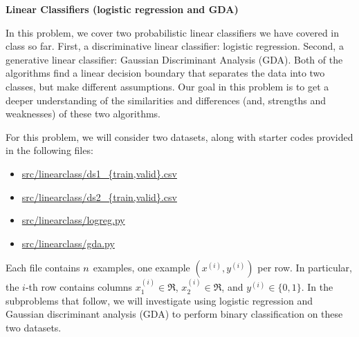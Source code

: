 \item {} {\bf Linear Classifiers (logistic regression and GDA)}

In this problem, we cover two probabilistic linear classifiers we have
covered in class so far. First, a discriminative linear classifier: logistic
regression. Second, a generative linear classifier: Gaussian Discriminant Analysis (GDA). Both of the algorithms find a linear decision boundary that
separates the data into two classes, but make different assumptions. Our goal
in this problem is to get a deeper understanding of the similarities and
differences (and, strengths and weaknesses) of these two algorithms.

For this problem, we will consider two datasets, along with starter codes provided in the following
files:
\begin{center}
\begin{itemize} %
	\item \url{src/linearclass/ds1_{train,valid}.csv}
	\item \url{src/linearclass/ds2_{train,valid}.csv}
        \item \url{src/linearclass/logreg.py}
        \item \url{src/linearclass/gda.py}
\end{itemize}
\end{center}
Each file contains ${n}$ examples, one example $(x^{(i)}, y^{(i)})$ per row.
In particular, the $i$-th row contains columns $x^{(i)}_1\in\Re$,
$x^{(i)}_2\in\Re$, and $y^{(i)}\in\{0, 1\}$. In the subproblems that follow, we
will investigate using logistic regression and Gaussian discriminant analysis
(GDA) to perform binary classification on these two datasets.

\begin{enumerate}
	
        \ifnum{} {
            
        } \fi

	
        \ifnum{} {
            
        } \fi


	
        \ifnum{} {
            
        }\fi

	
        \ifnum{} {
            
        } \fi

	
        \ifnum{} {
            
        } \fi

	
        \ifnum{} {
            
        } \fi

	
        \ifnum{}\fi

	
        \ifnum{}\fi

\end{enumerate}
